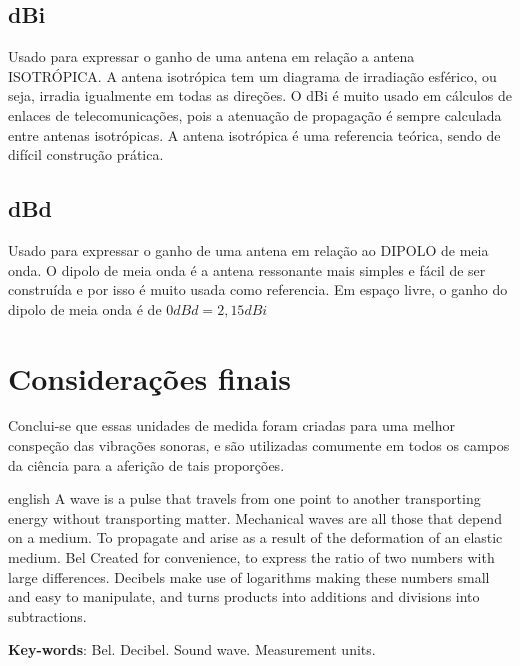 \documentclass[
	article,			%
	11pt,				%
	oneside,			%
	a4paper,			%
	english,			%
	brazil,				%
	sumario=tradicional
	]{abntex2}
\begin{document}
\subsection{dBi}
Usado para expressar o ganho de uma antena em relação a antena ISOTRÓPICA. A antena isotrópica tem um diagrama de irradiação esférico, ou seja, irradia igualmente em todas as direções. O dBi é muito usado em cálculos de enlaces de telecomunicações, pois a atenuação de propagação é sempre calculada entre antenas isotrópicas. A antena isotrópica é uma referencia teórica, sendo de difícil construção prática.

\subsection{dBd}
Usado para expressar o ganho de uma antena em relação ao DIPOLO de meia onda. O dipolo de meia onda é a antena ressonante mais simples e fácil de ser construída e por isso é muito usada como referencia. Em espaço livre, o ganho do dipolo de meia onda é de $0 dBd = 2,15 dBi$

\section*{Considerações finais}

Conclui-se que essas unidades de medida foram criadas para uma melhor conspeção das vibrações sonoras, e são utilizadas comumente em todos os campos da ciência para a aferição de tais proporções.

\postextual

\emptythanks
\maketitle

\renewcommand{\resumoname}{Abstract}
\begin{resumoumacoluna}
 \begin{otherlanguage*}{english}
   A wave is a pulse that travels from one point to another transporting energy without transporting matter. Mechanical waves are all those that depend on a medium. To propagate and arise as a result of the deformation of an elastic medium. Bel Created for convenience, to express the ratio of two numbers with large differences. Decibels make use of logarithms making these numbers small and easy to manipulate, and turns products into additions and divisions into subtractions.

   \vspace{\onelineskip}
 
   \noindent
   \textbf{Key-words}: Bel. Decibel. Sound wave. Measurement units.
 \end{otherlanguage*}  
\end{resumoumacoluna}


\end{document}
